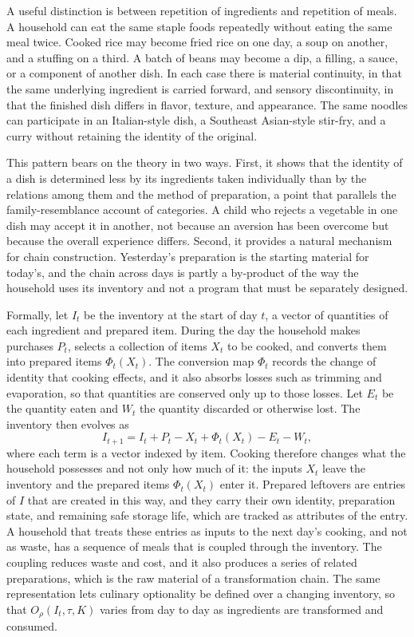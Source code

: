 \documentclass[11pt]{article}
\theoremstyle{remark}
\begin{document}
A useful distinction is between repetition of ingredients and repetition of meals. A household can eat the same staple foods repeatedly without eating the same meal twice. Cooked rice may become fried rice on one day, a soup on another, and a stuffing on a third. A batch of beans may become a dip, a filling, a sauce, or a component of another dish. In each case there is material continuity, in that the same underlying ingredient is carried forward, and sensory discontinuity, in that the finished dish differs in flavor, texture, and appearance. The same noodles can participate in an Italian-style dish, a Southeast Asian-style stir-fry, and a curry without retaining the identity of the original.

This pattern bears on the theory in two ways. First, it shows that the identity of a dish is determined less by its ingredients taken individually than by the relations among them and the method of preparation, a point that parallels the family-resemblance account of categories. A child who rejects a vegetable in one dish may accept it in another, not because an aversion has been overcome but because the overall experience differs. Second, it provides a natural mechanism for chain construction. Yesterday's preparation is the starting material for today's, and the chain across days is partly a by-product of the way the household uses its inventory and not a program that must be separately designed.

Formally, let $I_t$ be the inventory at the start of day $t$, a vector of quantities of each ingredient and prepared item. During the day the household makes purchases $P_t$, selects a collection of items $X_t$ to be cooked, and converts them into prepared items $\Phi_t(X_t)$. The conversion map $\Phi_t$ records the change of identity that cooking effects, and it also absorbs losses such as trimming and evaporation, so that quantities are conserved only up to those losses. Let $E_t$ be the quantity eaten and $W_t$ the quantity discarded or otherwise lost. The inventory then evolves as
\begin{equation}
I_{t+1} = I_t + P_t - X_t + \Phi_t(X_t) - E_t - W_t,
\end{equation}
where each term is a vector indexed by item. Cooking therefore changes what the household possesses and not only how much of it: the inputs $X_t$ leave the inventory and the prepared items $\Phi_t(X_t)$ enter it. Prepared leftovers are entries of $I$ that are created in this way, and they carry their own identity, preparation state, and remaining safe storage life, which are tracked as attributes of the entry. A household that treats these entries as inputs to the next day's cooking, and not as waste, has a sequence of meals that is coupled through the inventory. The coupling reduces waste and cost, and it also produces a series of related preparations, which is the raw material of a transformation chain. The same representation lets culinary optionality be defined over a changing inventory, so that $O_\rho(I_t, \tau, K)$ varies from day to day as ingredients are transformed and consumed.
\end{document}

